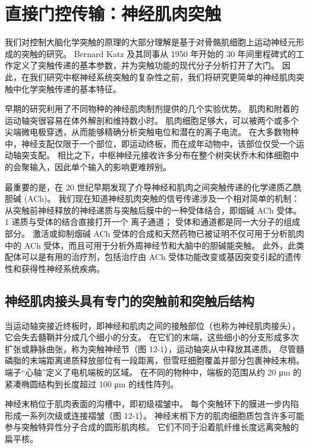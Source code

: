 \chapter{直接门控传输：神经肌肉突触} \label{chap:chap12}

我们对控制大脑化学突触的原理的大部分理解是基于对骨骼肌细胞上运动神经元形成的突触的研究。 
Bernard Katz 及其同事从 1950 年开始的 30 年间里程碑式的工作定义了突触传递的基本参数，并为突触功能的现代分子分析打开了大门。 
因此，在我们研究中枢神经系统突触的复杂性之前，我们将研究更简单的神经肌肉突触中化学突触传递的基本特征。


早期的研究利用了不同物种的神经肌肉制剂提供的几个实验优势。 
肌肉和附着的运动轴突很容易在体外解剖和维持数小时。 
肌肉细胞足够大，可以被两个或多个尖端微电极穿透，从而能够精确分析突触电位和潜在的离子电流。 
在大多数物种中，神经支配仅限于一个部位，即运动终板，而在成年动物中，该部位仅受一个运动轴突支配。 
相比之下，中枢神经元接收许多分布在整个树突状乔木和体细胞中的会聚输入，因此单个输入的影响更难辨别。


最重要的是，在 20 世纪早期发现了介导神经和肌肉之间突触传递的化学递质乙酰胆碱 (ACh)。 
我们现在知道神经肌肉突触的信号传递涉及一个相对简单的机制：从突触前神经释放的神经递质与突触后膜中的一种受体结合，即烟碱 ACh 受体。
1 递质与受体的结合直接打开一个 离子通道； 受体和通道都是同一大分子的组成部分。 
激活或抑制烟碱 ACh 受体的合成和天然药物已被证明不仅可用于分析肌肉中的 ACh 受体，而且可用于分析外周神经节和大脑中的胆碱能突触。 
此外，此类配体可以是有用的治疗剂，包括治疗由 ACh 受体功能改变或基因突变引起的遗传性和获得性神经系统疾病。


\section{神经肌肉接头具有专门的突触前和突触后结构}

当运动轴突接近终板时，即神经和肌肉之间的接触部位（也称为神经肌肉接头），它会失去髓鞘并分成几个细小的分支。 
在它们的末端，这些细小的分支形成多次扩张或静脉曲张，称为突触神经节（图 12-1），运动轴突从中释放其递质。 
尽管髓磷脂的末端距离递质释放部位有一段距离，但雪旺细胞覆盖并部分包裹神经末梢。 
端子“心轴”定义了电机端板的区域。 
在不同的物种中，端板的范围从约 20 μm 的紧凑椭圆结构到长度超过 100 μm 的线性阵列。


神经末梢位于肌肉表面的沟槽中，即初级褶皱中。 
每个突触环下的膜进一步内陷形成一系列次级或连接褶皱（图 12-1）。 
神经末梢下方的肌肉细胞质包含许多可能参与突触特异性分子合成的圆形肌肉核。 
它们不同于沿着肌纤维长度远离突触的扁平核。


